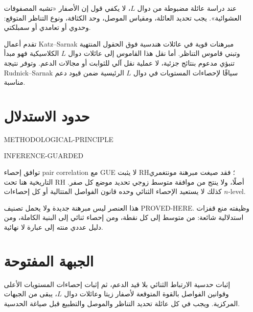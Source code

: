 \begin{remark}
\label{rem:ch23-katz-sarnak}
عند دراسة عائلة مضبوطة من دوال \(L\)، لا يكفي قول إن الأصفار «تشبه المصفوفات العشوائية». يجب تحديد العائلة، ومقياس الموصل، وحد الكثافة، ونوع التناظر المتوقع: وحدوي أو تعامدي أو سمبلكتي.
\end{remark}

تقدم أعمال Katz--Sarnak مبرهنات قوية في عائلات هندسية فوق الحقول المنتهية وتبني قاموس التناظر. أما نقل هذا القاموس إلى عائلات دوال \(L\) الكلاسيكية فهو مبدأ تنبؤي مدعوم بنتائج جزئية، لا عملية نقل آلي للثوابت أو مجالات الدعم. وتوفر نتيجة Rudnick--Sarnak \cite{rudnicksarnak1996zeros} سياقًا لإحصاءات المستويات في دوال \(L\) الرئيسية ضمن قيود دعم مناسبة.

\section{حدود الاستدلال}

\begin{remark}
\label{rem:ch23-inference-limits}
\begin{center}
\small\textenglish{METHODOLOGICAL-PRINCIPLE}\par
\small\textenglish{INFERENCE-GUARDED}
\end{center}
توافق إحصاء pair correlation مع GUE لا يثبت RH؛ فقد صيغت مبرهنة مونتغمري التاريخية هنا تحت RH أصلًا، ولا ينتج من موافقة متوسط زوجي تحديد موضع كل صفر. كذلك لا يستعيد الإحصاء الثنائي وحده قانون الفواصل المتتالية أو كل إحصاءات \(n\)-level.
\end{remark}

هذا العنصر ليس مبرهنة جديدة ولا يحمل تصنيف \textenglish{PROVED-HERE}. وظيفته منع قفزات استدلالية شائعة: من متوسط إلى كل نقطة، ومن إحصاء ثنائي إلى البنية الكاملة، ومن دليل عددي منته إلى عبارة لا نهائية.

\section{الجبهة المفتوحة}

\begin{openproblem}
\label{open:ch23-full-gue}
\openresult
إثبات حدسية الارتباط الثنائي بلا قيد الدعم، ثم إثبات إحصاءات المستويات الأعلى وقوانين الفواصل بالقوة المتوقعة لأصفار زيتا وعائلات دوال \(L\)، يبقى من الجبهات المركزية. ويجب في كل عائلة تحديد التناظر والموصل والتطبيع قبل صياغة الحدسية.
\end{openproblem}


